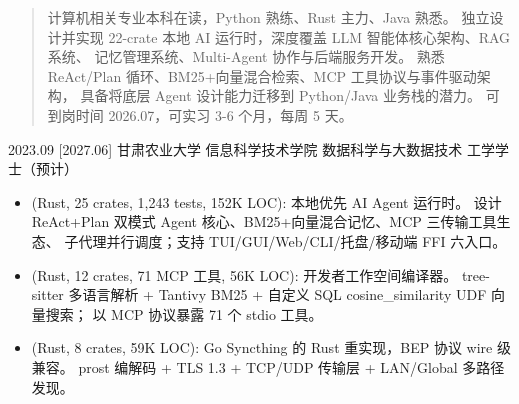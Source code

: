 \documentclass[zh]{resume}
\begin{document}
\makeheader

\begin{abstract}
计算机相关专业本科在读，Python 熟练、Rust 主力、Java 熟悉。
独立设计并实现 22-crate 本地 AI 运行时，深度覆盖 LLM 智能体核心架构、RAG 系统、
记忆管理系统、Multi-Agent 协作与后端服务开发。
熟悉 ReAct/Plan 循环、BM25+向量混合检索、MCP 工具协议与事件驱动架构，
具备将底层 Agent 设计能力迁移到 Python/Java 业务栈的潜力。
可到岗时间 2026.07，可实习 3-6 个月，每周 5 天。
\end{abstract}

\begin{competences}
\end{competences}

\begin{educations}
  \education%
    {2023.09}%
    [2027.06]%
    {甘肃农业大学}%
    {信息科学技术学院}%
    {数据科学与大数据技术}%
    {工学学士（预计）}
\end{educations}

\begin{itemize}
  \item {} (Rust, 25 crates, 1,243 tests, 152K LOC):
    本地优先 AI Agent 运行时。
    设计 ReAct+Plan 双模式 Agent 核心、BM25+向量混合记忆、MCP 三传输工具生态、
    子代理并行调度；支持 TUI/GUI/Web/CLI/托盘/移动端 FFI 六入口。
  \item {} (Rust, 12 crates, 71 MCP 工具, 56K LOC):
    开发者工作空间编译器。
    tree-sitter 多语言解析 + Tantivy BM25 + 自定义 SQL cosine\_similarity UDF 向量搜索；
    以 MCP 协议暴露 71 个 stdio 工具。
  \item {} (Rust, 8 crates, 59K LOC):
    Go Syncthing 的 Rust 重实现，BEP 协议 wire 级兼容。
    prost 编解码 + TLS 1.3 + TCP/UDP 传输层 + LAN/Global 多路径发现。
\end{itemize}
\end{document}
